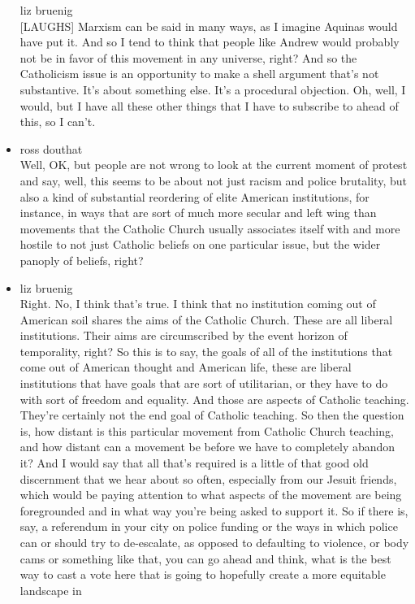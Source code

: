 \begin{itemize}
  liz bruenig\\
  {[}LAUGHS{]} Marxism can be said in many ways, as I imagine Aquinas
  would have put it. And so I tend to think that people like Andrew
  would probably not be in favor of this movement in any universe,
  right? And so the Catholicism issue is an opportunity to make a shell
  argument that's not substantive. It's about something else. It's a
  procedural objection. Oh, well, I would, but I have all these other
  things that I have to subscribe to ahead of this, so I can't.
\item
  ross douthat\\
  Well, OK, but people are not wrong to look at the current moment of
  protest and say, well, this seems to be about not just racism and
  police brutality, but also a kind of substantial reordering of elite
  American institutions, for instance, in ways that are sort of much
  more secular and left wing than movements that the Catholic Church
  usually associates itself with and more hostile to not just Catholic
  beliefs on one particular issue, but the wider panoply of beliefs,
  right?
\item
  liz bruenig\\
  Right. No, I think that's true. I think that no institution coming out
  of American soil shares the aims of the Catholic Church. These are all
  liberal institutions. Their aims are circumscribed by the event
  horizon of temporality, right? So this is to say, the goals of all of
  the institutions that come out of American thought and American life,
  these are liberal institutions that have goals that are sort of
  utilitarian, or they have to do with sort of freedom and equality. And
  those are aspects of Catholic teaching. They're certainly not the end
  goal of Catholic teaching. So then the question is, how distant is
  this particular movement from Catholic Church teaching, and how
  distant can a movement be before we have to completely abandon it? And
  I would say that all that's required is a little of that good old
  discernment that we hear about so often, especially from our Jesuit
  friends, which would be paying attention to what aspects of the
  movement are being foregrounded and in what way you're being asked to
  support it. So if there is, say, a referendum in your city on police
  funding or the ways in which police can or should try to de-escalate,
  as opposed to defaulting to violence, or body cams or something like
  that, you can go ahead and think, what is the best way to cast a vote
  here that is going to hopefully create a more equitable landscape in

\end{itemize}

